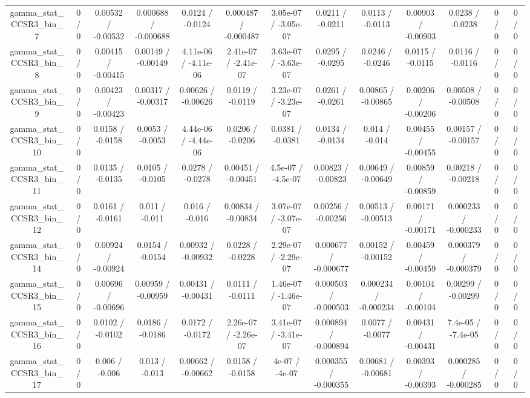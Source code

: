 \documentclass[10pt]{article}
\begin{document}
\begin{table}[htbp]
\begin{center}
\begin{tabular}{|c|c|c|c|c|c|c|c|c|c|c|c|c|}
  gamma_stat_CCSR3_bin_7 & 0 / 0 & 0.00532 / -0.00532 & 0.000688 / -0.000688 & 0.0124 / -0.0124 & 0.000487 / -0.000487 & 3.05e-07 / -3.05e-07 & 0.0211 / -0.0211 & 0.0113 / -0.0113 & 0.00903 / -0.00903 & 0.0238 / -0.0238 & 0 / 0 & 0 / 0 \\ 
  gamma_stat_CCSR3_bin_8 & 0 / 0 & 0.00415 / -0.00415 & 0.00149 / -0.00149 & 4.11e-06 / -4.11e-06 & 2.41e-07 / -2.41e-07 & 3.63e-07 / -3.63e-07 & 0.0295 / -0.0295 & 0.0246 / -0.0246 & 0.0115 / -0.0115 & 0.0116 / -0.0116 & 0 / 0 & 0 / 0 \\ 
  gamma_stat_CCSR3_bin_9 & 0 / 0 & 0.00423 / -0.00423 & 0.00317 / -0.00317 & 0.00626 / -0.00626 & 0.0119 / -0.0119 & 3.23e-07 / -3.23e-07 & 0.0261 / -0.0261 & 0.00865 / -0.00865 & 0.00206 / -0.00206 & 0.00508 / -0.00508 & 0 / 0 & 0 / 0 \\ 
  gamma_stat_CCSR3_bin_10 & 0 / 0 & 0.0158 / -0.0158 & 0.0053 / -0.0053 & 4.44e-06 / -4.44e-06 & 0.0206 / -0.0206 & 0.0381 / -0.0381 & 0.0134 / -0.0134 & 0.014 / -0.014 & 0.00455 / -0.00455 & 0.00157 / -0.00157 & 0 / 0 & 0 / 0 \\ 
  gamma_stat_CCSR3_bin_11 & 0 / 0 & 0.0135 / -0.0135 & 0.0105 / -0.0105 & 0.0278 / -0.0278 & 0.00451 / -0.00451 & 4.5e-07 / -4.5e-07 & 0.00823 / -0.00823 & 0.00649 / -0.00649 & 0.00859 / -0.00859 & 0.00218 / -0.00218 & 0 / 0 & 0 / 0 \\ 
  gamma_stat_CCSR3_bin_12 & 0 / 0 & 0.0161 / -0.0161 & 0.011 / -0.011 & 0.016 / -0.016 & 0.00834 / -0.00834 & 3.07e-07 / -3.07e-07 & 0.00256 / -0.00256 & 0.00513 / -0.00513 & 0.00171 / -0.00171 & 0.000233 / -0.000233 & 0 / 0 & 0 / 0 \\ 
  gamma_stat_CCSR3_bin_14 & 0 / 0 & 0.00924 / -0.00924 & 0.0154 / -0.0154 & 0.00932 / -0.00932 & 0.0228 / -0.0228 & 2.29e-07 / -2.29e-07 & 0.000677 / -0.000677 & 0.00152 / -0.00152 & 0.00459 / -0.00459 & 0.000379 / -0.000379 & 0 / 0 & 0 / 0 \\ 
  gamma_stat_CCSR3_bin_15 & 0 / 0 & 0.00696 / -0.00696 & 0.00959 / -0.00959 & 0.00431 / -0.00431 & 0.0111 / -0.0111 & 1.46e-07 / -1.46e-07 & 0.000503 / -0.000503 & 0.000234 / -0.000234 & 0.00104 / -0.00104 & 0.00299 / -0.00299 & 0 / 0 & 0 / 0 \\ 
  gamma_stat_CCSR3_bin_16 & 0 / 0 & 0.0102 / -0.0102 & 0.0186 / -0.0186 & 0.0172 / -0.0172 & 2.26e-07 / -2.26e-07 & 3.41e-07 / -3.41e-07 & 0.000894 / -0.000894 & 0.0077 / -0.0077 & 0.00431 / -0.00431 & 7.4e-05 / -7.4e-05 & 0 / 0 & 0 / 0 \\ 
  gamma_stat_CCSR3_bin_17 & 0 / 0 & 0.006 / -0.006 & 0.013 / -0.013 & 0.00662 / -0.00662 & 0.0158 / -0.0158 & 4e-07 / -4e-07 & 0.000355 / -0.000355 & 0.00681 / -0.00681 & 0.00393 / -0.00393 & 0.000285 / -0.000285 & 0 / 0 & 0 / 0 \\ 

\end{tabular}
\end{center}
\end{table}
\end{document}
